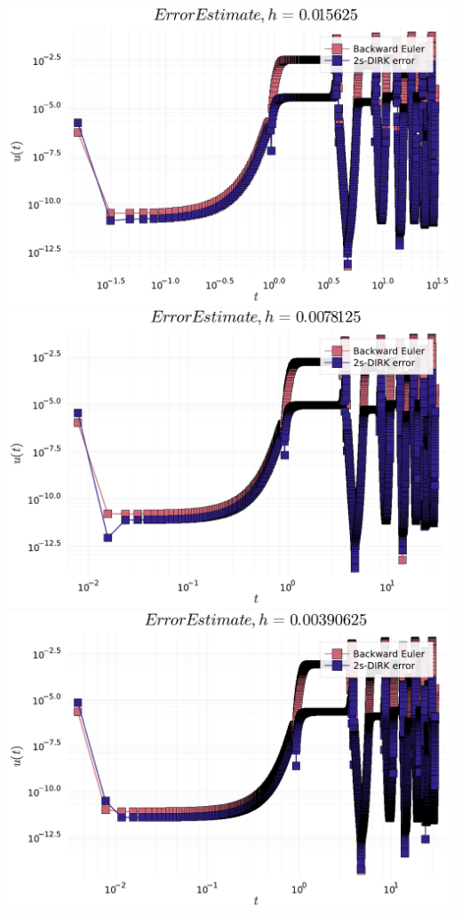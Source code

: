 \documentclass[12pt,a4paper]{article}
\begin{document}
\includegraphics[width=\linewidth]{figures/ass_3_report_9_4.pdf}
\includegraphics[width=\linewidth]{figures/ass_3_report_9_5.pdf}
\includegraphics[width=\linewidth]{figures/ass_3_report_9_6.pdf}
\end{document}
